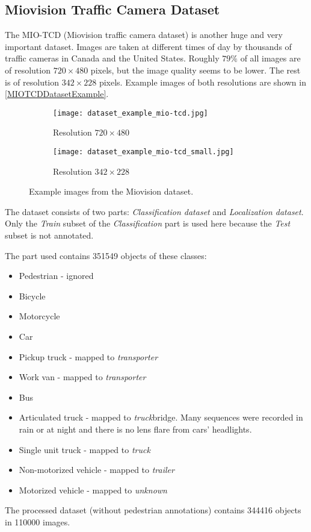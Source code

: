 \subsection{Miovision Traffic Camera Dataset}

The MIO-TCD (Miovision traffic camera dataset) \cite{MIO2018} is another huge
and very important dataset. Images are taken at different times of day by
thousands of traffic cameras in Canada and the United States. Roughly $79\%$ of
all images are of resolution $720 \times 480$ pixels, but the image quality
seems to be lower. The rest is of resolution $342 \times 228$ pixels. Example images of
both resolutions are shown in \autoref{MIOTCDDatasetExample}.

\begin{figure}[h]
    \centering
    \begin{subfigure}[b]{0.475\textwidth}
        \texttt{[image: dataset\_example\_mio-tcd.jpg]}
        \caption{Resolution $720 \times 480$}
    \end{subfigure}
    \begin{subfigure}[b]{0.475\textwidth}
        \texttt{[image: dataset\_example\_mio-tcd\_small.jpg]}
        \caption{Resolution $342 \times 228$}
    \end{subfigure}
    \caption{Example images from the Miovision dataset.}
    \label{MIOTCDDatasetExample}
\end{figure}

The dataset consists of two parts: \textit{Classification dataset} and
\textit{Localization dataset}. Only the \textit{Train} subset of the
\textit{Classification} part is used here because the \textit{Test} subset is
not annotated.

The part used contains \num{351549} objects of these classes:
\begin{itemize}
    \item Pedestrian - ignored
    \item Bicycle
    \item Motorcycle
    \item Car
    \item Pickup truck - mapped to \textit{transporter}
    \item Work van - mapped to \textit{transporter}
    \item Bus
    \item Articulated truck - mapped to \textit{truck}bridge. Many sequences were recorded in rain or at night and there is no lens flare from
    cars' headlights.
    \item Single unit truck - mapped to \textit{truck}
    \item Non-motorized vehicle - mapped to \textit{trailer}
    \item Motorized vehicle - mapped to \textit{unknown}
\end{itemize}
The processed dataset (without pedestrian annotations) contains \num{344416}
objects in \num{110000} images.

